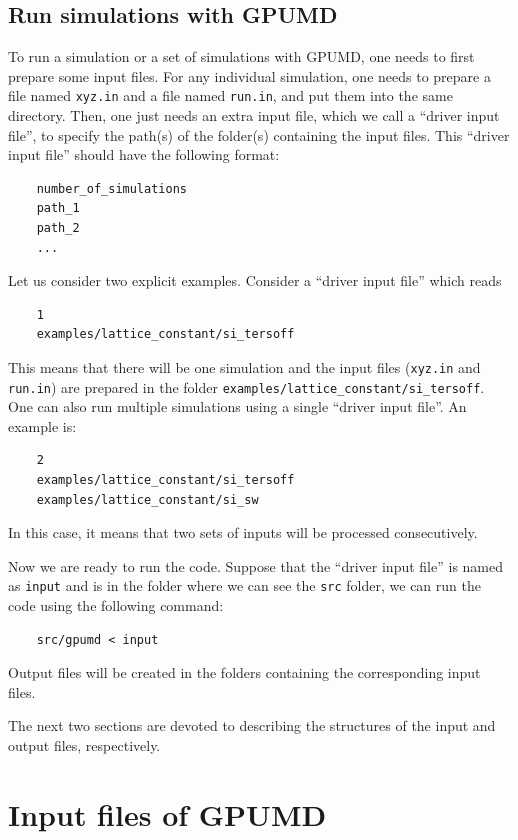 \documentclass[12pt,a4paper]{report}
\begin{document}
\subsection{Run simulations with GPUMD}

To run a simulation or a set of simulations with GPUMD, one needs to first prepare some input files. For any individual simulation, one needs to prepare a file named \verb"xyz.in" and a file named \verb"run.in", and put them into the same directory. Then, one just needs an extra input file, which we call a ``driver input file'', to specify the path(s) of the folder(s) containing the input files. This ``driver input file'' should have the following format:
\begin{verbatim}
    number_of_simulations
    path_1
    path_2
    ...
\end{verbatim}


Let us consider two explicit examples. Consider a ``driver input file'' which reads
\begin{verbatim}
    1
    examples/lattice_constant/si_tersoff
\end{verbatim}
This means that there will be one simulation and the input files (\verb"xyz.in" and \verb"run.in") are prepared in the folder \verb"examples/lattice_constant/si_tersoff". One can also run multiple simulations using a single ``driver input file''. An example is:
\begin{verbatim}
    2
    examples/lattice_constant/si_tersoff
    examples/lattice_constant/si_sw
\end{verbatim}
In this case, it means that two sets of inputs will be processed consecutively.

Now we are ready to run the code. Suppose that the ``driver input file'' is named as \verb"input" and is in the folder where we can see the \verb"src" folder, we can run the code using the following command:
\begin{verbatim}
    src/gpumd < input
\end{verbatim}
Output files will be created in the folders containing the corresponding input files.

The next two sections are devoted to describing the structures of the input and output files, respectively.




\section{Input files of GPUMD}
\end{document}

